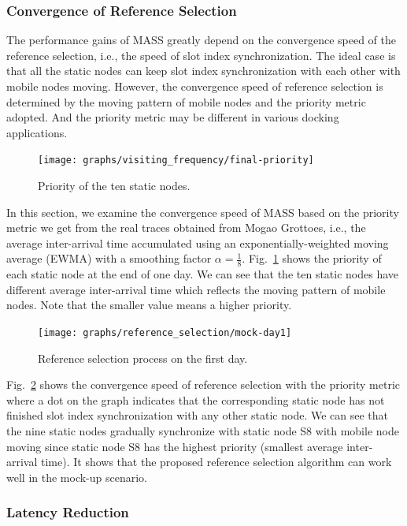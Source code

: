 \documentclass[twoside,twocolumn]{article}
\begin{document}
\subsubsection{Convergence of Reference Selection}

The performance gains of MASS greatly depend on the convergence speed of the reference
selection, i.e., the speed of slot index synchronization. The ideal case is that all the
static nodes can keep slot index synchronization with each other with mobile nodes moving.
However, the convergence speed of reference selection is determined by the moving pattern
of mobile nodes and the priority metric adopted. And the priority metric may be different
in various docking applications.
\begin{figure}[t]
   \centering
   \texttt{[image: graphs/visiting\_frequency/final-priority]}
   \caption{Priority of the ten static nodes.}
   \label{fig:mock-priority}
\end{figure}

In this section, we examine the convergence speed of MASS based on the priority metric we
get from the real traces obtained from Mogao Grottoes, i.e., the average inter-arrival time
accumulated using an exponentially-weighted moving average (EWMA) with a smoothing factor 
$\alpha = \frac{1}{8}$. Fig.~\ref{fig:mock-priority} shows the priority of each static node
at the end of one day. We can see that the ten static nodes have different average 
inter-arrival time which reflects the moving pattern of mobile nodes. Note that the smaller
value means a higher priority.

\begin{figure}[t]
   \centering
   \texttt{[image: graphs/reference\_selection/mock-day1]}
   \caption{Reference selection process on the first day.}
   \label{fig:mock-day1}
\end{figure}

Fig.~\ref{fig:mock-day1} shows the convergence speed of reference selection with the priority
metric where a dot on the graph indicates that the corresponding static node has not finished
slot index synchronization with any other static node. We can see that the nine static nodes
gradually synchronize with static node S8 with mobile node moving since static node S8 has
the highest priority (smallest average inter-arrival time). It shows that the proposed reference
selection algorithm can work well in the mock-up scenario.

\subsubsection{Latency Reduction}
\end{document}
